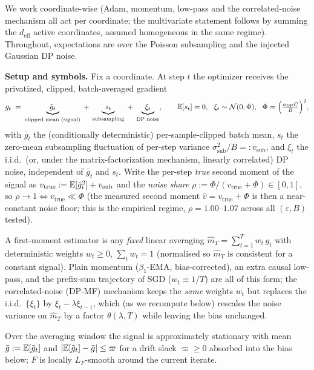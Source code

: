 We work coordinate-wise (Adam, momentum, low-pass and the correlated-noise mechanism all act per
coordinate; the multivariate statement follows by summing the $d_{\mathrm{eff}}$ active
coordinates, assumed homogeneous in the same regime). Throughout, expectations are over the Poisson
subsampling and the injected Gaussian DP noise.

\par\smallskip\noindent\textbf{Setup and symbols.}\quad 
Fix a coordinate. At step $t$ the optimizer receives the privatized, clipped, batch-averaged
gradient
\begin{equation}
\label{eq:gt}
g_t\;=\;\underbrace{\bar g_t}_{\text{clipped mean (signal)}}\;+\;\underbrace{s_t}_{\text{subsampling}}\;+\;\underbrace{\xi_t}_{\text{DP noise}},
\qquad \E[s_t]=0,\ \ \xi_t\sim\mathcal N(0,\Phi),\ \ \Phi=\Big(\tfrac{\sigma_{\mathrm{DP}}C}{B}\Big)^2,
\end{equation}
with $\bar g_t$ the (conditionally deterministic) per-sample-clipped batch mean, $s_t$ the
zero-mean subsampling fluctuation of per-step variance $\sigma_{\mathrm{sub}}^2/B=:v_{\mathrm{sub}}$,
and $\xi_t$ the i.i.d.\ (or, under the matrix-factorization mechanism, linearly correlated) DP
noise, independent of $\bar g_t$ and $s_t$. Write the per-step \emph{true} second moment of the
signal as $v_{\mathrm{true}}:=\mathbb{E}[\bar g_t^2]+v_{\mathrm{sub}}$ and the \emph{noise share}
$\rho:=\Phi/(v_{\mathrm{true}}+\Phi)\in[0,1]$, so $\rho\to1\iff v_{\mathrm{true}}\ll\Phi$
(the measured second moment $\hat v=v_{\mathrm{true}}+\Phi$ is then a near-constant noise floor;
this is the empirical regime, $\rho=1.00$--$1.07$ across all $(\varepsilon,B)$ tested).

A first-moment estimator is any \emph{fixed} linear averaging $\widehat m_T=\sum_{t=1}^{T}w_t\,g_t$
with deterministic weights $w_t\ge0$, $\sum_t w_t=1$ (normalised so $\widehat m_T$ is consistent for
a constant signal). Plain momentum ($\beta_1$-EMA, bias-corrected), an extra causal low-pass, and
the prefix-sum trajectory of SGD ($w_t\equiv1/T$) are all of this form; the correlated-noise
(DP-MF) mechanism keeps the \emph{same} weights $w_t$ but replaces the i.i.d.\ $\{\xi_t\}$ by
$\xi_t-\lambda\xi_{t-1}$, which (as we recompute below) rescales the noise variance on
$\widehat m_T$ by a factor $\theta(\lambda,T)$ while leaving the bias unchanged.

\begin{assumption}\label{ass:loc}
Over the averaging window the signal is approximately stationary with mean $\bar g:=\mathbb{E}[\bar g_t]$
and $|\mathbb{E}[\bar g_t]-\bar g|\le\varpi$ for a drift slack $\varpi\ge0$ absorbed into the bias below;
$F$ is locally $L_F$-smooth around the current iterate.
\end{assumption}

